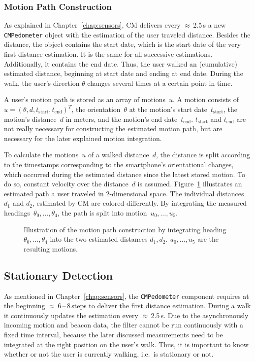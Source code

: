 \subsubsection*{Motion Path Construction}
As explained in Chapter~\ref{chap:sensors}, \acs{CM} delivers every $\approx$\,2.5\,s a new \texttt{CMPedometer} object with the estimation of the user traveled distance. Besides the distance, the object contains the start date, which is the start date of the very first distance estimation. It is the same for all successive estimations. Additionally, it contains the end date. Thus, the user walked an (cumulative) estimated distance, beginning at start date and ending at end date. During the walk, the user's direction $\theta$ changes several times at a certain point in time.

A user's motion path is stored as an array of motions~$u$. A motion consists of $u = (\theta, d, t_\text{start}, t_\text{end})^T$, the orientation~$\theta$ at the motion's start date~$t_\text{start}$, the motion's distance~$d$ in meters, and the motion's end date~$t_\text{end}$. $t_\text{start}$ and $t_\text{end}$ are not really necessary for constructing the estimated motion path, but are necessary for the later explained motion integration.

To calculate the motions~$u$ of a walked distance~$d$, the distance is split according to the timestamps corresponding to the smartphone's orientational changes, which occurred during the estimated distance since the latest stored motion. To do so, constant velocity over the distance~$d$ is assumed. Figure~\ref{fig:mm_path} illustrates an estimated path a user traveled in 2-dimensional space. The individual distances~$d_1$ and $d_2$, estimated by \acs{CM} are colored differently. By integrating the measured headings~$\theta_0, \ldots, \theta_4$, the path is split into motion~$u_0, \ldots, u_5$.

\begin{figure}
	
	\caption{Illustration of the motion path construction by integrating heading $\theta_0, \ldots, \theta_4$ into the two estimated distances $d_1, d_2$. $u_0, \ldots, u_5$ are the resulting motions.}
	\label{fig:mm_path}
\end{figure}


\subsection{Stationary Detection}\label{sec:algo_stationary}
As mentioned in Chapter~\ref{chap:sensors}, the \texttt{CMPedometer} component requires at the beginning $\approx$\,6\,--\,8\,steps to deliver the first distance estimation. During a walk it continuously updates the estimation every $\approx$\,2.5\,s. Due to the asynchronously incoming motion and beacon data, the filter cannot be run continuously with a fixed time interval, because the later discussed measurements need to be integrated at the right position on the user's walk. Thus, it is important to know whether or not the user is currently walking, i.e.\ is stationary or not.

